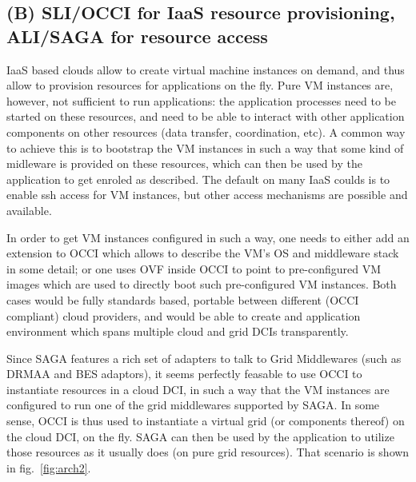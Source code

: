 \documentclass[10pt,conference,final,letterpaper,twoside,twocolumn,]{IEEEtran}
\begin{document}
 \subsection{(B) SLI/OCCI for IaaS resource provisioning, ALI/SAGA 
 for resource access}

 IaaS based clouds allow to create virtual machine instances on
 demand, and thus allow to provision resources for applications on the
 fly.  Pure VM instances are, however, not sufficient to run
 applications: the application processes need to be started on these resources,
 and need to be able to interact with other application components on
 other resources (data transfer, coordination, etc).  A common way to
 achieve this is to bootstrap the VM instances in such a way that some
 kind of midleware is provided on these resources, which can then be
 used by the application to get enroled as described.  The default on
 many IaaS coulds is to enable ssh access for VM instances, but other
 access mechanisms are possible and available.

 In order to get VM instances configured in such a way, one needs to
 either add an extension to OCCI which allows to describe the VM's OS
 and middleware stack in some detail; or one uses OVF inside OCCI to
 point to pre-configured VM images which are used to directly boot
 such pre-configured VM instances.  Both cases would be fully
 standards based, portable between different (OCCI compliant) cloud
 providers, and would be able to create and application environment
 which spans multiple cloud and grid DCIs transparently.
 
 Since SAGA features a rich set of adapters to talk to Grid
 Middlewares (such as DRMAA and BES adaptors), it seems perfectly
 feasable to use OCCI to instantiate resources in a cloud DCI, in such
 a way that the VM instances are configured to run one of the grid
 middlewares supported by SAGA.  In some sense, OCCI is thus used to
 instantiate a virtual grid (or components thereof) on the cloud DCI,
 on the fly.  SAGA can then be used by the application to utilize
 those resources as it usually does (on pure grid resources).  That
 scenario is shown in fig.~\ref{fig:arch2}.
\end{document}
